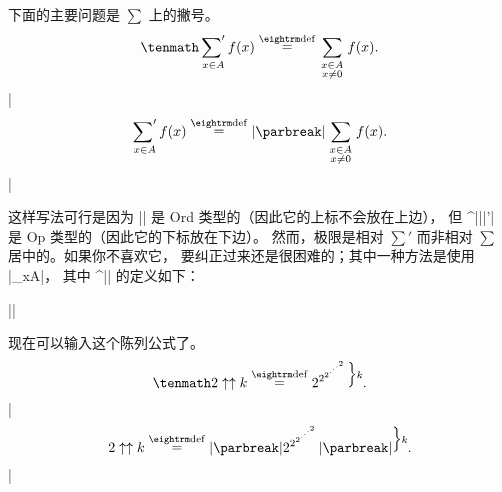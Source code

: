 \cchallenge 下面的主要问题是 $\sum$ 上的撇号。
$$\tenmath \mathop{{\sum}'}_{x\in A}f(x)\mathrel{\mathop=^{\rm def}}
  \sum_{\scriptstyle x\in A\atop\scriptstyle x\ne0}f(x).$$
\answer |$$\mathop{{\sum}'}_{x\in A}f(x)\mathrel{\mathop=^{\rm def}}|\parbreak
        |  \sum_{\scriptstyle x\in A\atop\scriptstyle x\ne0}f(x).$$|\par
\smallskip\noindent
这样写法可行是因为 |{\sum}| 是 Ord 类型的（因此它的上标不会放在上边），
但 ^|\mathop||{{\sum}'}| 是 Op 类型的（因此它的下标放在下边）。
然而，极限是相对 $\sum'$ 而非相对 $\sum$ 居中的。如果你不喜欢它，
要纠正过来还是很困难的；其中一种方法是使用 |\sumprime_{x\in A}|，
其中 ^|\sumprime| 的定义如下：
\par\nobreak\medskip
|\def\sumprime_#1{\setbox0=\hbox{$\scriptstyle{#1}$}|\parbreak
|  \setbox2=\hbox{$\displaystyle{\sum}$}|\parbreak
|  \setbox4=\hbox{${}'\mathsurround=0pt$}|\parbreak
|  \dimen0=.5\wd0 \advance\dimen0 by-.5\wd2|\parbreak
|  \ifdim\dimen0>0pt|\parbreak
\1|    \ifdim\dimen0>\wd4 \kern\wd4 \else\kern\dimen0\fi\fi|\parbreak
|  \mathop{{\sum}'}_{\kern-\wd4 #1}}|

\cchallenge \1现在可以输入这个陈列公式了。
$$\tenmath 2\uparrow\uparrow k\mathrel{\mathop=^{\rm def}}
  2^{2^{2^{\cdot^{\cdot^{\cdot^2}}}}}
    \vbox{\hbox{$\Big\}\scriptstyle k$}\kern0pt}.$$
\answer |$$2\uparrow\uparrow k\mathrel{\mathop=^{\rm def}}|\parbreak
        |  2^{2^{2^{\cdot^{\cdot^{\cdot^2}}}}}|\parbreak
        |    \vbox{\hbox{$\Big\}\scriptstyle k$}\kern0pt}.$$|\par

